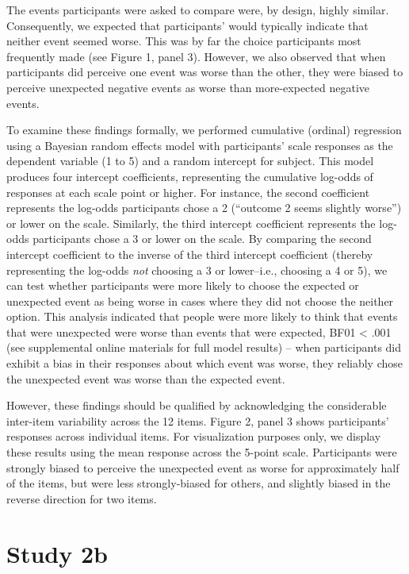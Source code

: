 \documentclass[10pt, letterpaper]{article}
\begin{document}
The events participants were asked to compare were, by design, highly
similar. Consequently, we expected that participants' would typically
indicate that neither event seemed worse. This was by far the choice
participants most frequently made (see Figure 1, panel 3). However, we
also observed that when participants did perceive one event was worse
than the other, they were biased to perceive unexpected negative events
as worse than more-expected negative events.

To examine these findings formally, we performed cumulative (ordinal)
regression using a Bayesian random effects model with participants'
scale responses as the dependent variable (1 to 5) and a random
intercept for subject. This model produces four intercept coefficients,
representing the cumulative log-odds of responses at each scale point or
higher. For instance, the second coefficient represents the log-odds
participants chose a 2 (``outcome 2 seems slightly worse'') or lower on
the scale. Similarly, the third intercept coefficient represents the
log-odds participants chose a 3 or lower on the scale. By comparing the
second intercept coefficient to the inverse of the third intercept
coefficient (thereby representing the log-odds \emph{not} choosing a 3
or lower--i.e., choosing a 4 or 5), we can test whether participants
were more likely to choose the expected or unexpected event as being
worse in cases where they did not choose the neither option. This
analysis indicated that people were more likely to think that events
that were unexpected were worse than events that were expected, BF01
\textless{} .001 (see supplemental online materials for full model
results) -- when participants did exhibit a bias in their responses
about which event was worse, they reliably chose the unexpected event
was worse than the expected event.

However, these findings should be qualified by acknowledging the
considerable inter-item variability across the 12 items. Figure 2, panel
3 shows participants' responses across individual items. For
visualization purposes only, we display these results using the mean
response across the 5-point scale. Participants were strongly biased to
perceive the unexpected event as worse for approximately half of the
items, but were less strongly-biased for others, and slightly biased in
the reverse direction for two items.

\section{Study 2b}\label{study-2b}
\end{document}
